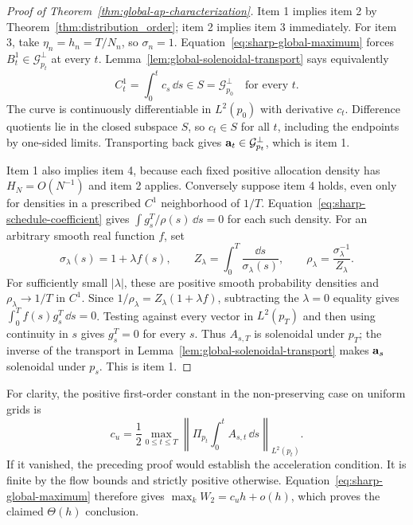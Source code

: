 \begin{proof}[Proof of Theorem~\ref{thm:global-ap-characterization}]
Item 1 implies item 2 by Theorem~\ref{thm:distribution_order}; item 2
implies item 3 immediately.  For item 3, take $\eta_n=h_n=T/N_n$,
so $\sigma_n=1$.  Equation~\eqref{eq:sharp-global-maximum} forces
$B_t^1\in\mathcal G_{p_t}^\perp$ at every $t$.
Lemma~\ref{lem:global-solenoidal-transport} says equivalently
\[
 C_t^1=\int_0^tc_s\,\dd s\in S=\mathcal G_{p_0}^\perp
 \quad\text{for every }t.
\]
The curve is continuously differentiable in $L^2(p_0)$ with derivative
$c_t$.  Difference quotients lie in the closed subspace $S$, so
$c_t\in S$ for all $t$, including the endpoints by one-sided limits.
Transporting back gives
$\mathbf a_t\in\mathcal G_{p_t}^\perp$, which is item 1.

Item 1 also implies item 4, because each fixed positive allocation
density has $H_N=O(N^{-1})$ and item 2 applies.  Conversely suppose
item 4 holds, even only for densities in a prescribed $C^1$
neighborhood of $1/T$.  Equation~\eqref{eq:sharp-schedule-coefficient}
gives $\int g_s^T/\rho(s)\,\dd s=0$ for each such density.
For an arbitrary smooth real function $f$, set
\[
 \sigma_\lambda(s)=1+\lambda f(s),\qquad
 Z_\lambda=\int_0^T\frac{\dd s}{\sigma_\lambda(s)},\qquad
 \rho_\lambda=\frac{\sigma_\lambda^{-1}}{Z_\lambda}.
\]
For sufficiently small $|\lambda|$, these are positive smooth
probability densities and $\rho_\lambda\to1/T$ in $C^1$.
Since $1/\rho_\lambda=Z_\lambda(1+\lambda f)$, subtracting the
$\lambda=0$ equality gives
$\int_0^Tf(s)g_s^T\,\dd s=0$.  Testing against every vector in
$L^2(p_T)$ and then using continuity in $s$ gives $g_s^T=0$ for
every $s$.  Thus $A_{s,T}$ is solenoidal under $p_T$; the inverse
of the transport in Lemma~\ref{lem:global-solenoidal-transport}
makes $\mathbf a_s$ solenoidal under $p_s$.  This is item 1.
\end{proof}

For clarity, the positive first-order constant in the non-preserving
case on uniform grids is
\begin{equation}
 c_u=\frac12\max_{0\le t\le T}
 \left\|\Pi_{p_t}\int_0^t A_{s,t}\,\dd s\right\|_{L^2(p_t)}.
 \label{eq:global-positive-constant}
\end{equation}
If it vanished, the preceding proof would establish the acceleration
condition.  It is finite by the flow bounds and strictly positive
otherwise.  Equation~\eqref{eq:sharp-global-maximum} therefore gives
$\max_kW_2=c_uh+o(h)$, which proves the claimed $\Theta(h)$ conclusion.

